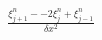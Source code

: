 \documentclass[preview]{standalone}
\begin{document}
\begin{align*}
\frac{\xi_{j+1}^{n} - -2 \xi_{j}^{n} + \xi_{j-1}^{n}}{\delta x^2}
\end{align*}
\end{document}
